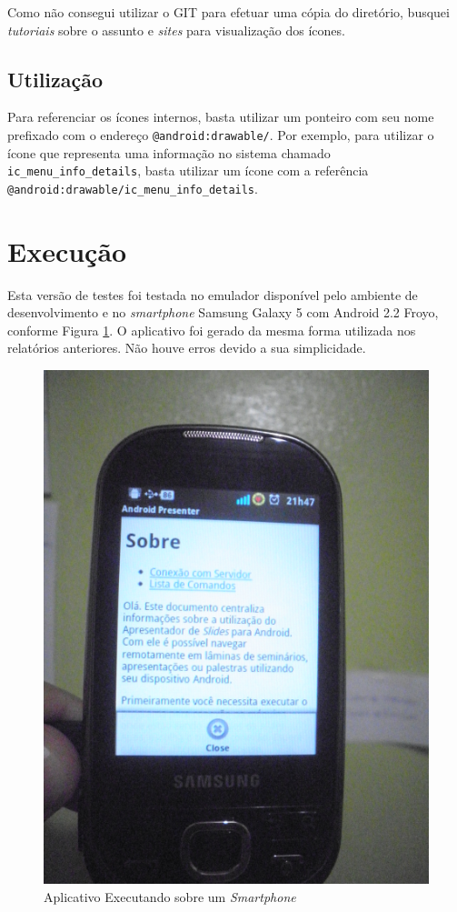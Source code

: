 \documentclass{article}
\begin{document}
Como não consegui utilizar o GIT para efetuar uma cópia do diretório, busquei
\emph{tutoriais} sobre o assunto e \emph{sites} para visualização dos ícones.

\subsection{Utilização}

Para referenciar os ícones internos, basta utilizar um ponteiro com seu nome
prefixado com o endereço \texttt{@android:drawable/}. Por exemplo, para utilizar
o ícone que representa uma informação no sistema chamado
\texttt{ic\_menu\_info\_details}, basta utilizar um ícone com a referência
\texttt{@android:drawable/ic\_menu\_info\_details}.

\section{Execução}
\label{sec:execucao}

Esta versão de testes foi testada no emulador disponível pelo ambiente de
desenvolvimento e no \emph{smartphone} Samsung Galaxy 5 com Android 2.2 Froyo,
conforme Figura \ref{fig:smart}. O aplicativo foi gerado da mesma forma
utilizada nos relatórios anteriores. Não houve erros devido a sua simplicidade.

\begin{figure}
    \centering{}
    \includegraphics[scale=0.3]{figura03.png}
    \caption{Aplicativo Executando sobre um \emph{Smartphone}}
    \label{fig:smart}
\end{figure}
\end{document}
